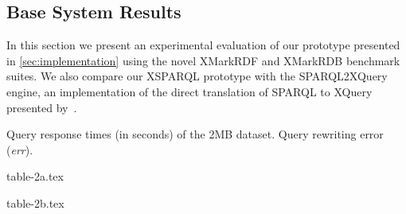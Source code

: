 \subsection{Base System Results}
\label{sec:results}

In this section we present an experimental evaluation of our prototype presented in \cref{sec:implementation}
using the novel XMarkRDF and XMarkRDB benchmark suites.
%
We also compare our XSPARQL prototype with the SPARQL2XQuery engine, an implementation of the direct translation of
SPARQL to XQuery presented by~\citet{GroppeGroppeLinnemann:2008aa}.


\begin{table*}[t]
  \caption[Query response times (in seconds) of the 2MB dataset.]{Query response times (in seconds) of the 2MB dataset.  Query rewriting error (\textit{err}).}
  \label{tab:results-2mb}
  \centering
  {table-2a.tex}

  \vspace{5pt}  

  {table-2b.tex}
\end{table*}



